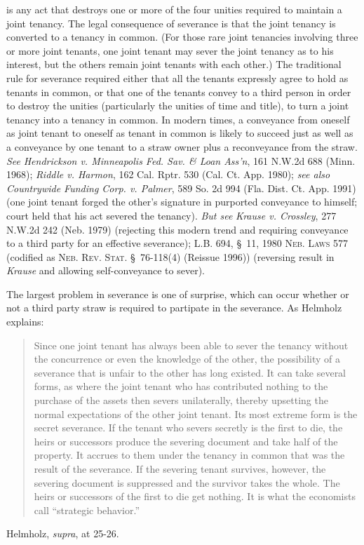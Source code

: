  is any act that destroys one or more of the four
unities required to
maintain a joint tenancy. The legal consequence of severance is that the joint
tenancy is converted to a tenancy in common. (For those rare joint tenancies
involving three or more joint tenants, one joint tenant may sever the joint
tenancy as to his interest, but the others remain joint tenants with each
other.) The traditional rule for severance required either that all the tenants
expressly agree to hold as tenants in common, or that one of the tenants convey
to a third person in order to destroy the unities (particularly the unities of
time and title), to turn a joint tenancy into a tenancy in common. In modern
times, a conveyance from oneself as joint tenant to oneself as tenant in common
is likely to succeed just as well as a conveyance by one tenant to a straw owner
plus a reconveyance from the straw. \textit{See} \emph{Hendrickson v.
Minneapolis Fed. Sav. \& Loan Ass'n}, 161 N.W.2d 688 (Minn. 1968); \emph{Riddle
v. Harmon}, 162 Cal. Rptr. 530 (Cal. Ct. App. 1980); \textit{see also}
\emph{Countrywide Funding Corp. v. Palmer}, 589 So. 2d 994 (Fla. Dist. Ct. App.
1991) (one joint tenant forged the other's signature in purported conveyance to
himself; court held that his act severed the tenancy). \textit{But see}
\emph{Krause v. Crossley}, 277 N.W.2d 242 (Neb. 1979) (rejecting this modern
trend and requiring conveyance to a third party for an effective severance);
L.B. 694, \S~11, 1980 \textsc{Neb. Laws} 577 (codified as \textsc{Neb. Rev.
Stat.} \S~76-118(4) (Reissue 1996)) (reversing result in \textit{Krause} and
allowing self-conveyance to sever).

The largest problem in severance is one of surprise, which can occur whether or
not a third party straw is required to partipate in the severance. As Helmholz
explains:
\begin{quote}
Since one joint tenant has always been able to sever the tenancy without the
concurrence or even the knowledge of the other, the possibility of a severance
that is unfair to the other has long existed. It can take several forms, as
where the joint tenant who has contributed nothing to the purchase of the
assets then severs unilaterally, thereby upsetting the normal expectations of
the other joint tenant. Its most extreme form is the secret severance. If the
tenant who severs secretly is the first to die, the heirs or successors produce
the severing document and take half of the property. It accrues to them under
the tenancy in common that was the result of the severance. If the severing
tenant survives, however, the severing document is suppressed and the survivor
takes the whole. The heirs or successors of the first to die get nothing. It is
what the economists call ``strategic behavior.''
\end{quote}
Helmholz, \textit{supra}, at 25-26.

